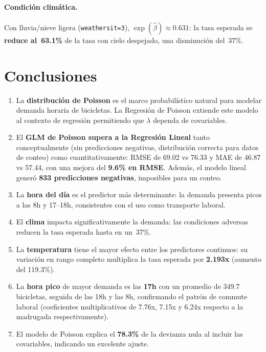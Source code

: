 \documentclass[12pt, a4paper]{article}
\begin{document}
	\paragraph{Condici\'on clim\'atica.}
	Con lluvia/nieve ligera (\texttt{weathersit=3}), $\exp(\hat{\beta}) \approx 0.631$:
	la tasa esperada se \textbf{reduce al~63.1\%} de la tasa con cielo despejado,
	una disminuci\'on del~37\%.
	
	\section{Conclusiones}
	
	\begin{enumerate}
		\item La \textbf{distribuci\'on de Poisson} es el marco probabil\'istico natural
		para modelar demanda horaria de bicicletas. La Regresi\'on de Poisson extiende
		este modelo al contexto de regresi\'on permitiendo que $\lambda$ dependa de
		covariables.
		
		\item El \textbf{GLM de Poisson supera a la Regresi\'on Lineal} tanto
		conceptualmente (sin predicciones negativas, distribuci\'on correcta para datos
		de conteo) como cuantitativamente: RMSE de 69.02 vs 76.33 y MAE de 46.87
		vs 57.44, con una mejora del \textbf{9.6\% en RMSE}. Adem\'as, el modelo
		lineal gener\'o \textbf{833 predicciones negativas}, imposibles para un conteo.
		
		\item La \textbf{hora del d\'ia} es el predictor m\'as determinante: la demanda
		presenta picos a las 8h y 17--18h, consistentes con el uso como transporte
		laboral.
		
		\item El \textbf{clima} impacta significativamente la demanda: las condiciones
		adversas reducen la tasa esperada hasta en un~37\%.
		
		\item La \textbf{temperatura} tiene el mayor efecto entre los predictores
		continuos: su variaci\'on en rango completo multiplica la tasa esperada por
		\textbf{2.193x} (aumento del 119.3\%).
		
		\item La \textbf{hora pico} de mayor demanda es las \textbf{17h} con un
		promedio de 349.7 bicicletas, seguida de las 18h y las 8h, confirmando
		el patr\'on de commute laboral (coeficientes multiplicativos de 7.76x,
		7.15x y 6.24x respecto a la madrugada respectivamente).
		
		\item El modelo de Poisson explica el \textbf{78.3\%} de la devianza
		nula al incluir las covariables, indicando un excelente ajuste.
	\end{enumerate}
	
\end{document}
